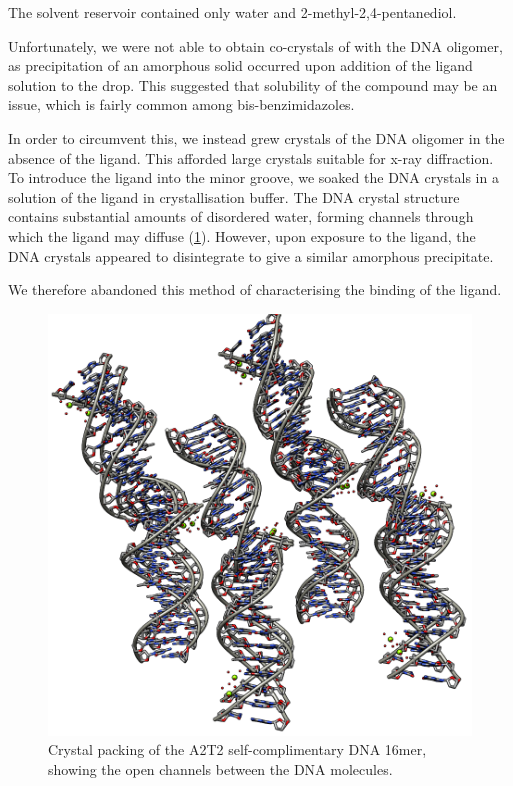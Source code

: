 \begin{refsection}
The solvent reservoir contained only water and 2-methyl-2,4-pentanediol.

Unfortunately, we were not able to obtain co-crystals of  with the DNA oligomer, as precipitation of an amorphous solid occurred upon addition of the ligand solution to the drop.
This suggested that solubility of the compound may be an issue, which is fairly common among bis-benzimidazoles.

In order to circumvent this, we instead grew crystals of the DNA oligomer in the absence of the ligand.
This afforded large crystals suitable for x-ray diffraction.
To introduce the ligand into the minor groove, we soaked the DNA crystals in a solution of the ligand in crystallisation buffer.
The DNA crystal structure contains substantial amounts of disordered water, forming channels through which the ligand may diffuse (\cref{fig:dna-oligo}).
However, upon exposure to the ligand, the DNA crystals appeared to disintegrate to give a similar amorphous precipitate.

We therefore abandoned this method of characterising the binding of the ligand.

\begin{figure}
    \includegraphics[width=0.7\linewidth]{Figures/dna_oligo.png}
    \caption{Crystal packing of the A2T2 self-complimentary DNA 16mer, showing the open channels between the DNA molecules.}\label{fig:dna-oligo}
\end{figure}


\end{refsection}

